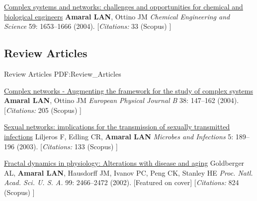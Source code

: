 \NumberedItem{\makebox[0.8cm][r]{[1]}}
\href{/people/amaral/complex-systems-and-networks-challenges-and-opportunities-for-chemical-and-biological-engineers}
{Complex systems and networks: challenges and opportunities for chemical and biological engineers}
\newline
{\textbf{Amaral LAN}}, Ottino JM
\newline
\textit{Chemical Engineering and Science}
    59:
1653--1666 (2004).
    [{\em{Citations:}}  33 (Scopus) ]
\newline
\Gap
~
\Gap

\vspace*{0.2cm}\subsection
{Review Articles}
{Review Articles}
{PDF:Review_Articles}

\GapNoBreak
\NumberedItem{\makebox[0.8cm][r]{[6]}}
\href{/people/amaral/complex-networks-augmenting-the-framework-for-the-study-of-complex-systems}
{Complex networks - Augmenting the framework for the study of complex systems}
\newline
{\textbf{Amaral LAN}}, Ottino JM
\newline
\textit{European Physical Journal B}
    38:
147--162 (2004).
    [{\em{Citations:}}  205 (Scopus) ]
\newline
\Gap
~
\Gap

\NumberedItem{\makebox[0.8cm][r]{[5]}}
\href{/people/amaral/sexual-networks-implications-for-the-transmission-of-sexually-transmitted-infections}
{Sexual networks: implications for the transmission of sexually transmitted infections}
\newline
Liljeros F, Edling CR, {\textbf{Amaral LAN}}
\newline
\textit{Microbes and Infections}
    5:
189--196 (2003).
    [{\em{Citations:}}  133 (Scopus) ]
\newline
\Gap
~
\Gap

\NumberedItem{\makebox[0.8cm][r]{[4]}}
\href{/people/amaral/fractal-dynamics-in-physiology-alterations-with-disease-and-aging}
{Fractal dynamics in physiology: Alterations with disease and aging}
\newline
Goldberger AL, {\textbf{Amaral LAN}}, Hausdorff JM, Ivanov PC, Peng CK, Stanley HE
\newline
\textit{Proc. Natl. Acad. Sci. U. S. A.}
    99:
2466--2472 (2002).
    [Featured on cover]
    [{\em{Citations:}}  824 (Scopus) ]
\newline
\Gap
~
\Gap

